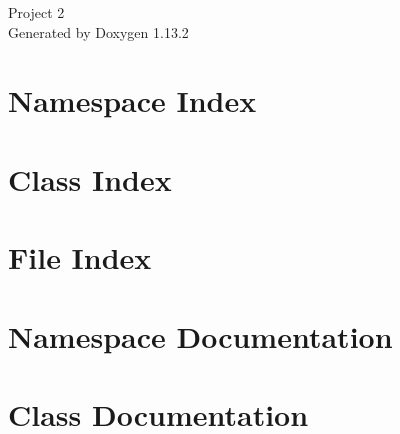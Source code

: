 \documentclass[twoside]{book}
\newcommand{\+}{\discretionary{\mbox{\scriptsize$\hookleftarrow$}}{}{}}
\newcommand{\clearemptydoublepage}{%
    \newpage{\pagestyle{empty}\cleardoublepage}%
  }
\begin{document}
  \raggedbottom
    \hypersetup{pageanchor=false,
                bookmarksnumbered=true,
                pdfencoding=unicode
               }
  \begin{titlepage}
  \vspace*{7cm}
  \begin{center}%
  {\Large Project 2}\\
  \vspace*{1cm}
  {\large Generated by Doxygen 1.13.2}\\
  \end{center}
  \end{titlepage}
  \clearemptydoublepage
  \tableofcontents
  \clearemptydoublepage
  \hypersetup{pageanchor=true}

\chapter{Namespace Index}

\chapter{Class Index}

\chapter{File Index}

\chapter{Namespace Documentation}

\chapter{Class Documentation}



\end{document}
